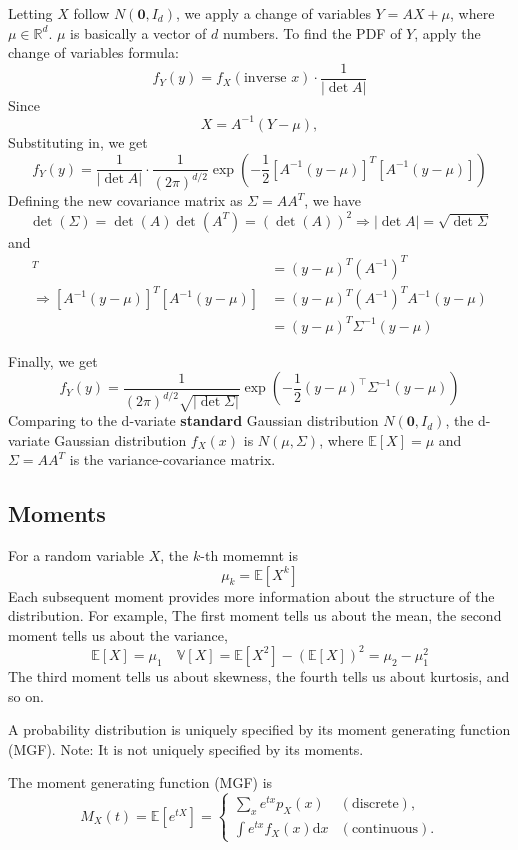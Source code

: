 \documentclass[../Probability.tex]{subfiles}
\begin{document}
\medskip
\noindent Letting $X$ follow $N(\mathbf{0},I_d)$, we apply a change of variables $Y=AX+\mu$, where $\mu\in\mathbb{R}^d$.\newline
$\mu$ is basically a vector of $d$ numbers.\newline
To find the PDF of $Y$, apply the change of variables formula:
\[f_Y(y)=f_X(\text{inverse }x)\cdot \frac{1}{|\det A|}\]
Since
\[X=A^{-1}(Y-\mu),\]
Substituting in, we get
\[f_Y(y)=\frac{1}{|\det A|}\cdot \frac{1}{(2\pi)^{d/2}}\exp(-\frac{1}{2}[A^{-1}(y-\mu)]^T[A^{-1}(y-\mu)])\]
Defining the new covariance matrix as $\Sigma = AA^T$, we have
\[\det(\Sigma)=\det(A)\det(A^T)=(\det(A))^2\Rightarrow |\det A|=\sqrt{\det\Sigma}\]
and
\begin{align*}
    [A^{-1}(y-\mu)]^T &= (y-\mu)^T(A^{-1})^T \\
    \Rightarrow [A^{-1}(y-\mu)]^T[A^{-1}(y-\mu)] &= (y-\mu)^T(A^{-1})^TA^{-1}(y-\mu) \\ 
    &= (y-\mu)^T\Sigma^{-1}(y-\mu)
\end{align*}

\noindent Finally, we get
\[f_Y(y) = \frac{1}{(2\pi)^{d/2} \sqrt{|\det \Sigma|}} \exp\left( -\frac{1}{2} (y - \mu)^\top \Sigma^{-1} (y - \mu) \right)\]
Comparing to the d-variate \textbf{standard} Gaussian distribution $N(\mathbf{0},I_d)$,\newline
the d-variate Gaussian distribution $f_X(x)$ is $N(\mu, \Sigma)$, where $\mathbb{E}[X]=\mu$ and $\Sigma=AA^T$ is the variance-covariance matrix.

\subsection{Moments}
For a random variable $X$, the $k$-th momemnt is
\[\mu_k=\mathbb{E}[X^k]\]
Each subsequent moment provides more information about the structure of the distribution.\newline
For example,\newline
The first moment tells us about the mean, the second moment tells us about the variance,
\[\mathbb{E}[X] = \mu_1\quad\mathbb{V}[X] = \mathbb{E}[X^2]-(\mathbb{E}[X])^2=\mu_2-\mu_1^2\]
The third moment tells us about skewness, the fourth tells us about kurtosis, and so on.

\medskip
\noindent A probability distribution is uniquely specified by its moment generating function (MGF).
Note: It is not uniquely specified by its moments.

\noindent The moment generating function (MGF) is
\[M_X(t) = \mathbb{E}[e^{tX}] = 
\begin{cases} 
   \displaystyle \sum_{x} e^{tx} p_X(x) & (\text{discrete}), \\[15pt]
   \displaystyle \int e^{tx} f_X(x) \mathrm{d}x & (\text{continuous}).
\end{cases}\]
\end{document}
